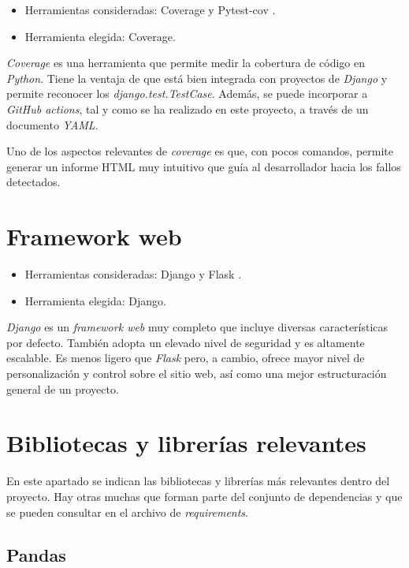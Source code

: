 \begin{itemize}
\tightlist
\item
  Herramientas consideradas: Coverage  \citep{online:coverage} y Pytest-cov \citep{online:pytest_cov}.
\item
  Herramienta elegida: Coverage.
\end{itemize}

\emph{Coverage} es una herramienta que permite medir la cobertura de código en \emph{Python}. 
Tiene la ventaja de que está bien integrada con proyectos de \emph{Django} y permite reconocer
los \emph{django.test.TestCase}. Además, se puede incorporar a \emph{GitHub actions}, tal y como 
se ha realizado en este proyecto, a través de un documento \emph{YAML}.

Uno de los aspectos relevantes de \emph{coverage} es que, con pocos comandos, permite generar
un informe HTML muy intuitivo que guía al desarrollador hacia los fallos detectados. 


\section{Framework web}\label{framework_web}

\begin{itemize}
\tightlist
\item
  Herramientas consideradas: Django \citep{online:django} y Flask \citep{online:flask}.
\item
  Herramienta elegida: Django.
\end{itemize}

\emph{Django} es un \emph{framework web} muy completo que incluye diversas características por defecto. También adopta un elevado nivel de seguridad y es altamente escalable. Es menos ligero que
\emph{Flask} pero, a cambio, ofrece mayor nivel de personalización y control sobre el sitio web, así como una mejor estructuración general de un proyecto.  


\section{Bibliotecas y librerías relevantes}\label{librerias_relevantes}

En este apartado se indican las bibliotecas y librerías más relevantes dentro del proyecto. Hay otras muchas que forman parte del conjunto de dependencias y que se pueden consultar en el archivo de \emph{requirements}.

\subsection{Pandas}\label{pandas}

